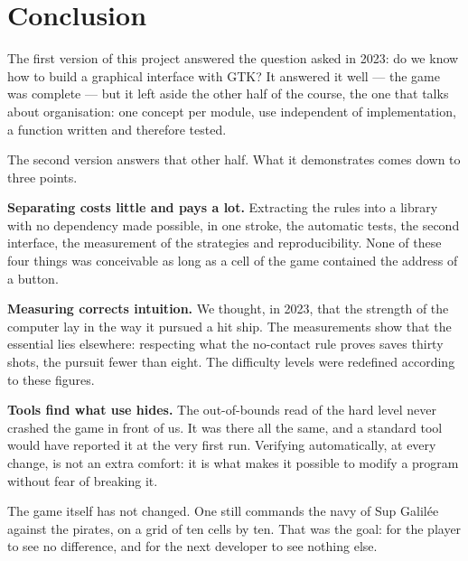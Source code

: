\chapter{Conclusion}
\label{chap-conclusion}

The first version of this project answered the question asked in 2023: do we know how to
build a graphical interface with GTK? It answered it well --- the game was complete --- but
it left aside the other half of the course, the one that talks about organisation: one
concept per module, use independent of implementation, a function written and therefore
tested.

The second version answers that other half. What it demonstrates comes down to three points.

\textbf{Separating costs little and pays a lot.} Extracting the rules into a library with no
dependency made possible, in one stroke, the automatic tests, the second interface, the
measurement of the strategies and reproducibility. None of these four things was conceivable
as long as a cell of the game contained the address of a button.

\textbf{Measuring corrects intuition.} We thought, in 2023, that the strength of the computer
lay in the way it pursued a hit ship. The measurements show that the essential lies
elsewhere: respecting what the no-contact rule proves saves thirty shots, the pursuit fewer
than eight. The difficulty levels were redefined according to these figures.

\textbf{Tools find what use hides.} The out-of-bounds read of the hard level never crashed
the game in front of us. It was there all the same, and a standard tool would have reported
it at the very first run. Verifying automatically, at every change, is not an extra comfort:
it is what makes it possible to modify a program without fear of breaking it.

The game itself has not changed. One still commands the navy of Sup Galilée against the
pirates, on a grid of ten cells by ten. That was the goal: for the player to see no
difference, and for the next developer to see nothing else.
